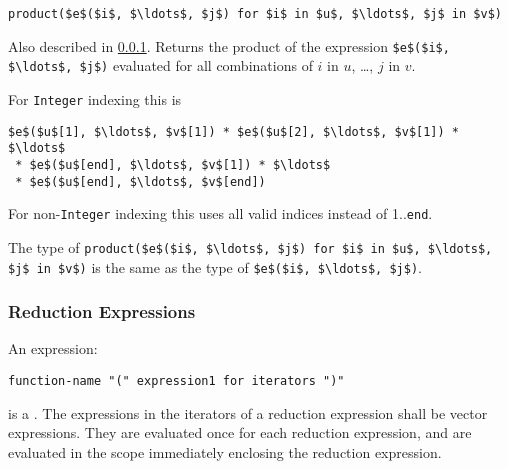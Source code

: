 \begin{operatordefinition*}[product]\label{modelica:product-reduction}
\begin{synopsis}\begin{lstlisting}
product($e$($i$, $\ldots$, $j$) for $i$ in $u$, $\ldots$, $j$ in $v$)
\end{lstlisting}\end{synopsis}
\begin{semantics}
Also described in \cref{reduction-expressions}.  Returns the product of the expression \lstinline!$e$($i$, $\ldots$, $j$)! evaluated for all combinations of $i$ in $u$, \ldots, $j$ in $v$.

For \lstinline!Integer! indexing this is
\begin{lstlisting}[language=modelica]
$e$($u$[1], $\ldots$, $v$[1]) * $e$($u$[2], $\ldots$, $v$[1]) * $\ldots$
 * $e$($u$[end], $\ldots$, $v$[1]) * $\ldots$
 * $e$($u$[end], $\ldots$, $v$[end])
\end{lstlisting}
For non-\lstinline!Integer! indexing this uses all valid indices instead of 1..\lstinline!end!.

The type of \lstinline!product($e$($i$, $\ldots$, $j$) for $i$ in $u$, $\ldots$, $j$ in $v$)! is the same as the type of \lstinline!$e$($i$, $\ldots$, $j$)!.
\end{semantics}
\end{operatordefinition*}

\subsubsection{Reduction Expressions}\label{reduction-expressions}

An expression:
\begin{lstlisting}[language=grammar]
function-name "(" expression1 for iterators ")"
\end{lstlisting}%
is a .
The expressions in the iterators of a reduction expression shall be vector expressions.
They are evaluated once for each reduction expression, and are evaluated in the scope immediately enclosing the reduction expression.

